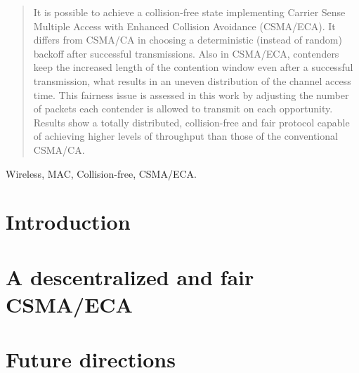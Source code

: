 \documentclass[conference]{IEEEtran}
\begin{document}
\begin{abstract}

\boldmath It is possible to achieve a collision-free state implementing Carrier Sense Multiple Access with Enhanced Collision Avoidance (CSMA/ECA). It differs from CSMA/CA in choosing a deterministic (instead of random) backoff after successful transmissions. Also in CSMA/ECA, contenders keep the increased length of the contention window even after a successful transmission, what results in an uneven distribution of the channel access time. This fairness issue is assessed in this work by adjusting the number of packets each contender is allowed to transmit on each opportunity. Results show a totally distributed, collision-free and fair protocol capable of achieving higher levels of throughput than those of the conventional CSMA/CA.



\end{abstract}

\begin{IEEEkeywords}
Wireless, MAC, Collision-free, CSMA/ECA.
\end{IEEEkeywords}

\section{Introduction} \label{introduction}
  

\section{A descentralized and fair CSMA/ECA} \label{csmae2ca}
  

\section{Future directions} \label{future}
  
  


  
\end{document}

